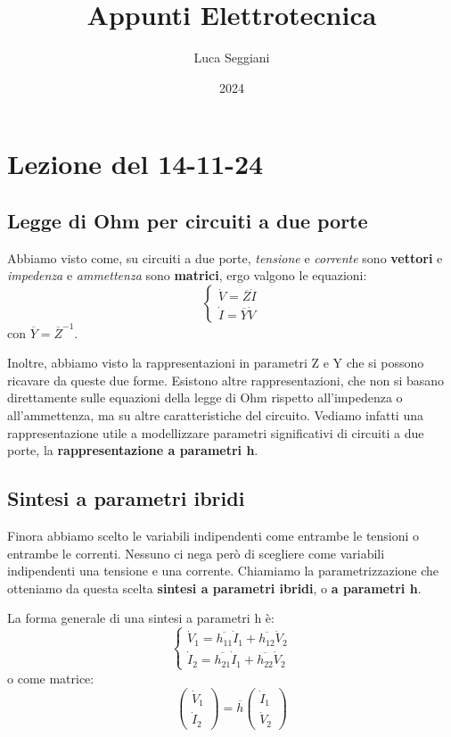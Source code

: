 \documentclass[a4paper,11pt]{article}
\title{Appunti Elettrotecnica}
\author{Luca Seggiani}
\date{2024}
\begin{document}
\section{Lezione del 14-11-24}

\thispagestyle{empty}
\pagestyle{fancy}

\subsection{Legge di Ohm per circuiti a due porte}
Abbiamo visto come, su circuiti a due porte, \textit{tensione} e \textit{corrente} sono \textbf{vettori} e \textit{impedenza} e \textit{ammettenza} sono \textbf{matrici}, ergo valgono le equazioni:
\[
	\begin{cases}
		\dot{V} = \overline{Z} \dot{I} \\ 
		\dot{I} = \overline{Y} \dot{V}
	\end{cases}
\]
con $\overline{Y} = \overline{Z}^{-1}$. 

Inoltre, abbiamo visto la rappresentazioni in parametri Z e Y che si possono ricavare da queste due forme.
Esistono altre rappresentazioni, che non si basano direttamente sulle equazioni della legge di Ohm rispetto all'impedenza o all'ammettenza, ma su altre caratteristiche del circuito.
Vediamo infatti una rappresentazione utile a modellizzare parametri significativi di circuiti a due porte, la \textbf{rappresentazione a parametri h}.

\subsection{Sintesi a parametri ibridi}
Finora abbiamo scelto le variabili indipendenti come entrambe le tensioni o entrambe le correnti. 
Nessuno ci nega però di scegliere come variabili indipendenti una tensione e una corrente.
Chiamiamo la parametrizzazione che otteniamo da questa scelta \textbf{sintesi a parametri ibridi}, o \textbf{a parametri h}.

La forma generale di una sintesi a parametri h è:
\[
	\begin{cases}
		\dot{V}_1 = \overline{h_{11}} \dot{I}_1 + \overline{h_{12}} \dot{V}_2 \\ 
		\dot{I}_2 = \overline{h_{21}} \dot{I}_1 + \overline{h_{22}} \dot{V}_2
	\end{cases}
\]
o come matrice:
$$
\begin{pmatrix}
	\dot{V}_1 \\ \dot{I}_2
\end{pmatrix}
= \overline{h}
\begin{pmatrix}
	\dot{I}_1 \\ \dot{V}_2
\end{pmatrix}
$$
\end{document}
